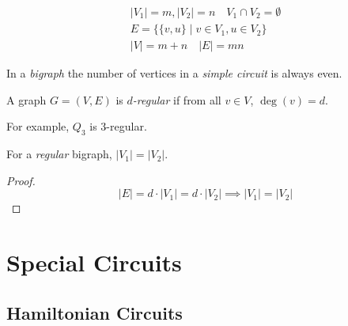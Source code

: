 \documentclass[00_complete]{subfiles}
\begin{document}
\begin{definition}
    \begin{gather*}
    |V_1|=m,|V_2|=n \quad V_1 \cap V_2 = \emptyset \\
    E = \{\{v,u\} \mid v \in V_1, u \in V_2\} \\
    |V|=m+n \quad |E|=mn
    \end{gather*}
\end{definition}
\begin{claim}
    In a \emph{bigraph} the number of vertices in a \emph{simple circuit} is
    always even.
\end{claim}
\begin{definition}
    A graph $G=(V,E)$ is \emph{$d$-regular} if from all $v \in V$, $\deg(v)=d$.

    For example, $Q_3$ is $3$-regular.
\end{definition}
\begin{claim}
    For a \emph{regular} bigraph, $|V_1|=|V_2|$.
\end{claim}
\begin{proof}
    $$|E|=d\cdot |V_1|=d\cdot |V_2| \implies |V_1|=|V_2|$$
\end{proof}
\section{Special Circuits}
\subsection{Hamiltonian Circuits}
\end{document}
